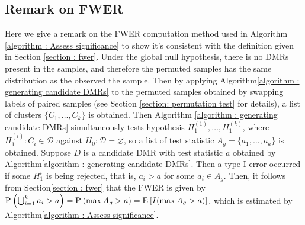 \documentclass{report}
\begin{document}
    \subsection{Remark on FWER} \label{section:fwer remark}
   \par
   Here we give a remark on the FWER computation method used in  Algorithm \ref{algorithm : Assess significance} to show
  it's consistent with the definition given in Section \ref{section : fwer}. Under the global null hypothesis,  there is no DMRs present in the samples, and therefore the permuted
   samples has the same distribution as the observed the sample. Then by applying Algorithm\ref{algorithm : generating candidate DMRs} to the permuted samples obtained
   by swapping labels of paired samples (see Section \ref{section: permutation test} for details), a list of clusters $\{C_1,\ldots,C_k\}$ is obtained.
   Then  Algorithm \ref{algorithm : generating candidate DMRs} simultaneously tests hypothesis 
   $H_1^{(1)}, \ldots, H_1^{(k)}$, where $H_1^{(i)} : C_i \in \mathcal{D}$ against $H_0 : \mathcal{D} = \varnothing$, so a list of test statistic $A_g = \{a_1,\ldots,a_k\}$ is obtained.
   Suppose $D$ is a candidate DMR with test statistic $a$ obtained by Algorithm\ref{algorithm : generating candidate DMRs}. Then a type I error
   occurred if some $H_1^{i}$ is being rejected, that is, $a_i> a$ for some $a_i \in A_g$. Then, it follows from Section\ref{section : fwer} that
   the FWER is given by $\mathrm{P}_{} \left(  \bigcup_{i=1}^k a_i > a \right) = \mathrm{P}_{} \left( \max{A_g} >a \right) = \mathrm{E}_{} \left[ I(\max{A_g} >a) \right]$, which is estimated by Algorithm\ref{algorithm : Assess significance}.
\end{document}

